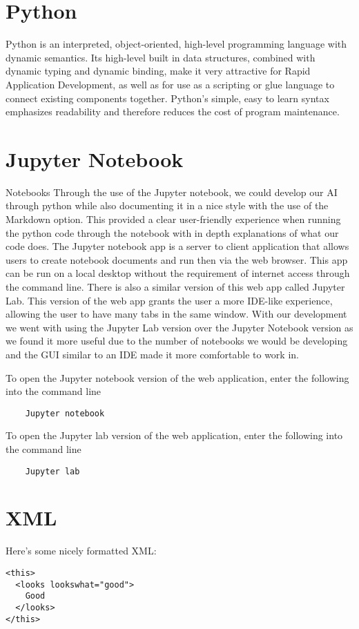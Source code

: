 \section{Python}
Python is an interpreted, object-oriented, high-level programming language with dynamic semantics. Its high-level built in data structures, combined with dynamic typing and dynamic binding, make it very attractive for Rapid Application Development, as well as for use as a scripting or glue language to connect existing components together. Python's simple, easy to learn syntax emphasizes readability and therefore reduces the cost of program maintenance. 

\section{Jupyter Notebook}
Notebooks
Through the use of the Jupyter notebook, we could develop our AI through python while also documenting it in a nice style with the use of the Markdown option. This provided a clear user-friendly experience when running the python code through the notebook with in depth explanations of what our code does. The Jupyter notebook app is a server to client application that allows users to create notebook documents and run then via the web browser. This app can be run on a local desktop without the requirement of internet access through the command line. There is also a similar version of this web app called Jupyter Lab. This version of the web app grants the user a more IDE-like experience, allowing the user to have many tabs in the same window. With our development we went with using the Jupyter Lab version over the Jupyter Notebook version as we found it more useful due to the number of notebooks we would be developing and the GUI similar to an IDE made it more comfortable to work in. 

To open the Jupyter notebook version of the web application, enter the following into the command line
\begin{verbatim}	
	Jupyter notebook 
\end{verbatim}
To open the Jupyter lab version of the web application, enter the following into the command line
\begin{verbatim}
	Jupyter lab 
\end{verbatim}

\section{XML}
Here's some nicely formatted XML:
\begin{verbatim}
<this>
  <looks lookswhat="good">
    Good
  </looks>
</this>
\end{verbatim}